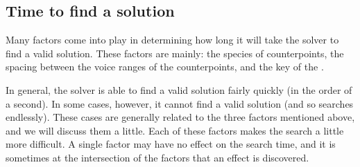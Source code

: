 \subsection{Time to find a solution} \label{section:time-to-find-a-solution}
Many factors come into play in determining how long it will take the solver to find a valid solution. These factors are mainly: the species of counterpoints, the spacing between the voice ranges of the counterpoints, and the key of the \cf.


In general, the solver is able to find a valid solution fairly quickly (in the order of a second). In some cases, however, it cannot find a valid solution (and so searches endlessly). These cases are generally related to the three factors mentioned above, and we will discuss them a little. Each of these factors makes the search a little more difficult. A single factor may have no effect on the search time, and it is sometimes at the intersection of the factors that an effect is discovered.

